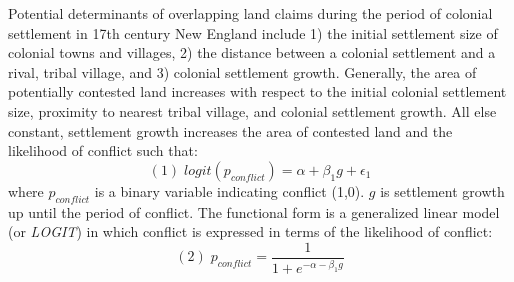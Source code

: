 \documentclass[11pt]{article}
\begin{document}
Potential determinants of overlapping land claims during the period of colonial settlement in 17th century New England include 1) the initial settlement size of colonial towns and villages, 2) the distance between a colonial settlement and a rival, tribal village, and 3) colonial settlement growth. Generally, the area of potentially contested land increases with respect to the initial colonial settlement size, proximity to nearest tribal village, and colonial settlement growth. All else constant, settlement growth increases the area of contested land and the likelihood of conflict such that: 
$$ (1) \; logit(p_{conflict})= \alpha + \beta_{1}g + \epsilon_{1} $$
where $p_{conflict}$ is a binary variable indicating conflict (1,0). $g$ is settlement growth up until the period of conflict. The functional form is a generalized linear model (or {\em LOGIT}) in which conflict is expressed in terms of the likelihood of conflict:
\[
(2) \;p_{conflict}=\frac{1}{1+e^{-\alpha-\beta_{1}g}}
\]
\end{document}
